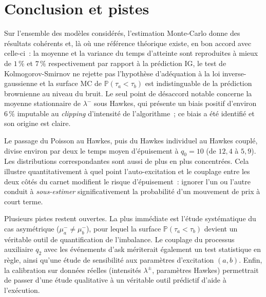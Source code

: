\documentclass[11pt,a4paper]{article}
\newcommand{\Pb}{\mathbb{P}}
\begin{document}
\section{Conclusion et pistes}

Sur l'ensemble des modèles considérés, l'estimation Monte-Carlo donne des
résultats cohérents et, là où une référence théorique existe, en bon accord
avec celle-ci~: la moyenne et la variance du temps d'atteinte sont reproduites
à mieux de $1\,\%$ et $7\,\%$ respectivement par rapport à la prédiction IG, le
test de Kolmogorov-Smirnov ne rejette pas l’hypothèse d’adéquation à la loi 
inverse-gaussienne et la surface MC de $\Pb(\tau_a < \tau_b)$ est
indistinguable de la prédiction brownienne au niveau du bruit. Le seul point
de désaccord notable concerne la moyenne stationnaire de $\lambda^-$ sous
Hawkes, qui présente un biais positif d'environ $6\,\%$ imputable au
\emph{clipping} d'intensité de l'algorithme~; ce biais a été identifié et son
origine est claire.

Le passage du Poisson au Hawkes, puis du Hawkes individuel au Hawkes couplé,
divise environ par deux le temps moyen d'épuisement à $q_0 = 10$ (de $12{,}4$
à $5{,}9$). Les distributions correspondantes sont aussi de plus en plus
concentrées. Cela illustre quantitativement à quel point l'auto-excitation et
le couplage entre les deux côtés du carnet modifient le risque
d'épuisement~: ignorer l'un ou l'autre conduit à \emph{sous-estimer}
significativement la probabilité d'un mouvement de prix à court terme.

Plusieurs pistes restent ouvertes. La plus immédiate est l'étude systématique
du cas asymétrique ($\mu^-_a \neq \mu^-_b$), pour lequel la surface
$\Pb(\tau_a < \tau_b)$ devient un véritable outil de quantification de
l'imbalance. Le couplage du processus auxiliaire $q_2$ avec les événements
d'ask mériterait également un test statistique en règle, ainsi qu'une étude
de sensibilité aux paramètres d'excitation $(a, b)$. Enfin, la calibration
sur données réelles (intensités $\lambda^\pm$, paramètres Hawkes) permettrait
de passer d'une étude qualitative à un véritable outil prédictif d'aide à
l'exécution.
\end{document}
